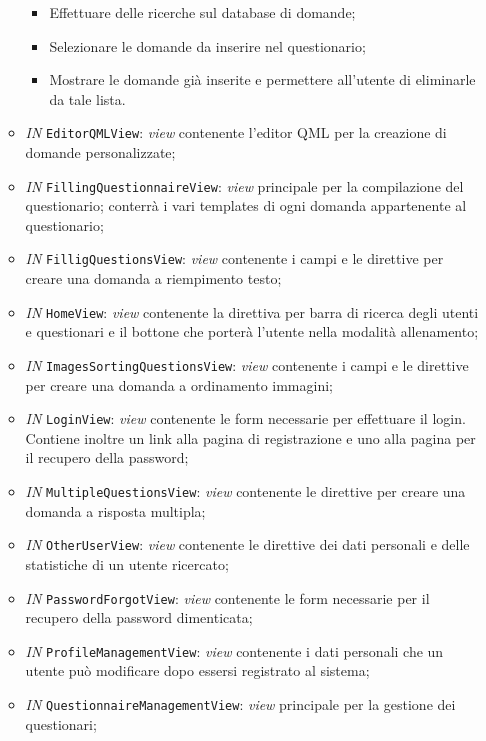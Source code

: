 \begin{itemize}
\begin{itemize}
\begin{itemize}
				\item Effettuare delle ricerche sul database di domande;
				\item Selezionare le domande da inserire nel questionario;
				\item Mostrare le domande già inserite e permettere all'utente di eliminarle da tale lista.
			\end{itemize}
			\item \textit{IN} \texttt{EditorQMLView}: \textit{view} contenente l'editor QML per la creazione di domande personalizzate;
			\item \textit{IN} \texttt{FillingQuestionnaireView}: \textit{view} principale per la compilazione del questionario; conterrà i vari templates di ogni domanda appartenente al questionario;
			\item \textit{IN} \texttt{FilligQuestionsView}: \textit{view} contenente i campi e le direttive per creare una domanda a riempimento testo;
			\item \textit{IN} \texttt{HomeView}: \textit{view} contenente la direttiva per barra di ricerca degli utenti e questionari e il bottone che porterà l'utente nella modalità allenamento;
			\item \textit{IN} \texttt{ImagesSortingQuestionsView}: \textit{view} contenente i campi e le direttive per creare una domanda a ordinamento immagini;
			\item \textit{IN} \texttt{LoginView}: \textit{view} contenente le form necessarie per effettuare il login. Contiene inoltre un link alla pagina di registrazione e uno alla pagina per il recupero della password;
			\item \textit{IN} \texttt{MultipleQuestionsView}: \textit{view} contenente le direttive per creare una domanda a risposta multipla;
			\item \textit{IN} \texttt{OtherUserView}: \textit{view} contenente le direttive dei dati personali e delle statistiche di un utente ricercato;
			\item \textit{IN} \texttt{PasswordForgotView}: \textit{view} contenente le form necessarie per il recupero della password dimenticata; 
			\item \textit{IN} \texttt{ProfileManagementView}: \textit{view} contenente i dati personali che un utente può modificare dopo essersi registrato al sistema;
			\item \textit{IN} \texttt{QuestionnaireManagementView}:  \textit{view} principale per la gestione dei questionari;

\end{itemize}
\end{itemize}
